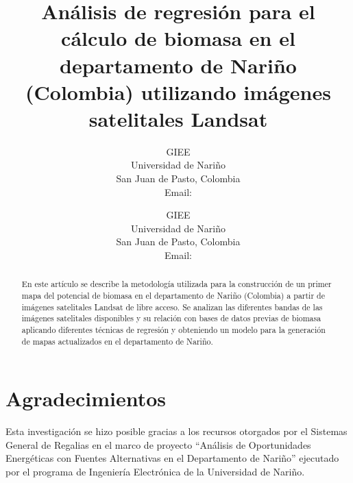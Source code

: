 \documentclass[twocolumn]{article}
\begin{document}
\pagestyle{empty}  

\title{Análisis de regresión para el cálculo de biomasa en el departamento de Nariño (Colombia) utilizando imágenes satelitales Landsat}

\author{GIEE \\
Universidad de Nariño\\
San Juan de Pasto, Colombia\\
Email: }

\author{GIEE \\
Universidad de Nariño\\
San Juan de Pasto, Colombia\\
Email: }

\maketitle

\begin{abstract}

En este artículo se describe la metodología utilizada para la construcción de un primer mapa del potencial de biomasa en el departamento de Nariño (Colombia) a partir de imágenes satelitales Landsat de libre acceso. Se analizan las diferentes bandas de las imágenes satelitales disponibles y su relación con bases de datos previas de biomasa aplicando diferentes técnicas de regresión y obteniendo un modelo para la generación de mapas actualizados en el departamento de Nariño.

\end{abstract}

\thispagestyle{empty} 




%



\section*{Agradecimientos}

Esta investigación se hizo posible gracias a los recursos otorgados por el Sistemas General de Regalias en el marco de proyecto ``Análisis de Oportunidades Energéticas con Fuentes Alternativas en el Departamento de Nariño'' ejecutado por el programa de Ingeniería Electrónica de la Universidad de Nariño.




\end{document}

